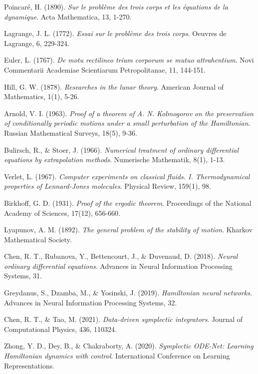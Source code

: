 \documentclass[11pt,a4paper]{article}
\begin{document}
\begin{thebibliography}{99}

Poincaré, H. (1890).
\textit{Sur le problème des trois corps et les équations de la dynamique}.
Acta Mathematica, 13, 1-270.

Lagrange, J. L. (1772).
\textit{Essai sur le problème des trois corps}.
Oeuvres de Lagrange, 6, 229-324.

Euler, L. (1767).
\textit{De motu rectilineo trium corporum se mutuo attrahentium}.
Novi Commentarii Academiae Scientiarum Petropolitanae, 11, 144-151.

Hill, G. W. (1878).
\textit{Researches in the lunar theory}.
American Journal of Mathematics, 1(1), 5-26.

Arnold, V. I. (1963).
\textit{Proof of a theorem of A. N. Kolmogorov on the preservation of conditionally periodic motions under a small perturbation of the Hamiltonian}.
Russian Mathematical Surveys, 18(5), 9-36.

Bulirsch, R., \& Stoer, J. (1966).
\textit{Numerical treatment of ordinary differential equations by extrapolation methods}.
Numerische Mathematik, 8(1), 1-13.

Verlet, L. (1967).
\textit{Computer experiments on classical fluids. I. Thermodynamical properties of Lennard-Jones molecules}.
Physical Review, 159(1), 98.

Birkhoff, G. D. (1931).
\textit{Proof of the ergodic theorem}.
Proceedings of the National Academy of Sciences, 17(12), 656-660.

Lyapunov, A. M. (1892).
\textit{The general problem of the stability of motion}.
Kharkov Mathematical Society.

Chen, R. T., Rubanova, Y., Bettencourt, J., \& Duvenaud, D. (2018).
\textit{Neural ordinary differential equations}.
Advances in Neural Information Processing Systems, 31.

Greydanus, S., Dzamba, M., \& Yosinski, J. (2019).
\textit{Hamiltonian neural networks}.
Advances in Neural Information Processing Systems, 32.

Chen, R. T., \& Tao, M. (2021).
\textit{Data-driven symplectic integrators}.
Journal of Computational Physics, 436, 110324.

Zhong, Y. D., Dey, B., \& Chakraborty, A. (2020).
\textit{Symplectic ODE-Net: Learning Hamiltonian dynamics with control}.
International Conference on Learning Representations.


\end{thebibliography}
\end{document}
